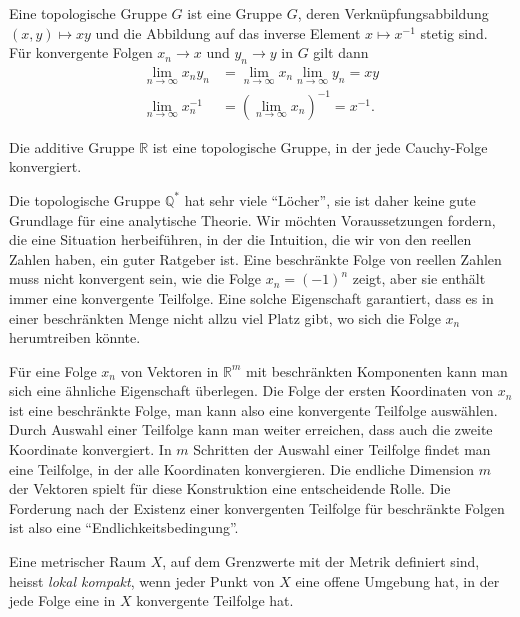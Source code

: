 \begin{definition}
\label{buch:gruppen:gruppe:def:topgruppe}
Eine topologische Gruppe $G$ ist eine Gruppe $G$, deren Verknüpfungsabbildung
$(x,y)\mapsto xy$ und die Abbildung auf das inverse Element $x\mapsto x^{-1}$
stetig sind.
Für konvergente Folgen $x_n\to x$ und $y_n\to y$ in $G$ gilt dann
\begin{align*}
\lim_{n\to \infty} x_ny_n &= \lim_{n\to\infty} x_n \lim_{n\to\infty} y_n = xy
\\
\lim_{n\to \infty} x_n^{-1} &= (\lim_{n\to\infty} x_n)^{-1} = x^{-1}.
\end{align*}
\end{definition}

\begin{beispiel}
Die additive Gruppe $\mathbb{R}$ ist eine topologische Gruppe, in der
jede Cauchy-Folge konvergiert.
\end{beispiel}

Die topologische Gruppe $\mathbb{Q}^*$ hat sehr viele ``Löcher'', sie ist
daher keine gute Grundlage für eine analytische Theorie.
Wir möchten Voraussetzungen fordern, die eine Situation herbeiführen,
in der die Intuition, die wir von den reellen Zahlen haben, ein guter
Ratgeber ist.
Eine beschränkte Folge von reellen Zahlen muss nicht konvergent sein,
wie die Folge $x_n=(-1)^n$ zeigt,
aber sie enthält immer eine konvergente Teilfolge.
Eine solche Eigenschaft garantiert, dass es in einer beschränkten
Menge nicht allzu viel Platz gibt, wo sich die Folge $x_n$ herumtreiben
könnte.

Für eine Folge $x_n$ von Vektoren in $\mathbb{R}^m$ mit beschränkten
Komponenten kann man sich eine ähnliche Eigenschaft überlegen.
Die Folge der ersten Koordinaten von $x_n$ ist eine beschränkte Folge,
man kann also eine konvergente Teilfolge auswählen.
Durch Auswahl einer Teilfolge kann man weiter erreichen, dass auch die
zweite Koordinate konvergiert.
In $m$ Schritten der Auswahl einer Teilfolge findet man eine
Teilfolge, in der alle Koordinaten konvergieren.
Die endliche Dimension $m$ der Vektoren spielt für diese Konstruktion
eine entscheidende Rolle.
Die Forderung nach der Existenz einer konvergenten Teilfolge für beschränkte
Folgen ist also eine ``Endlichkeitsbedingung''.

\begin{definition}
Eine metrischer Raum $X$, auf dem Grenzwerte mit der Metrik
definiert sind, heisst {\em lokal kompakt}, wenn jeder Punkt von $X$
eine offene Umgebung hat, in der jede Folge
eine in $X$ konvergente Teilfolge hat.
\end{definition}

